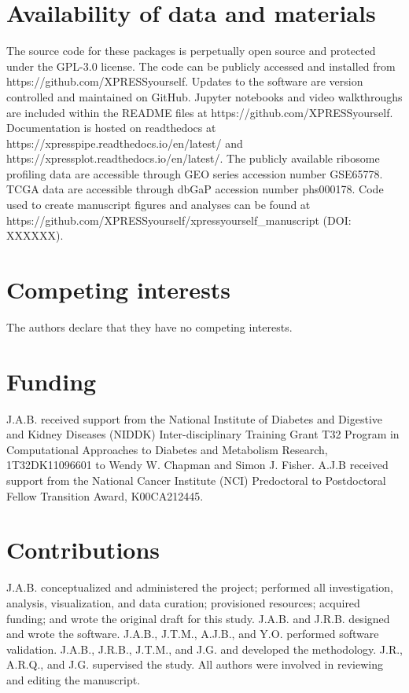 \documentclass[10pt, oneside]{article}
\begin{document}
\section*{Availability of data and materials}
The source code for these packages is perpetually open source and protected under the GPL-3.0 license. The code can be publicly accessed and installed from https://github.com/XPRESSyourself. Updates to the software are version controlled and maintained on GitHub. Jupyter notebooks and video walkthroughs are included within the README files at https://github.com/XPRESSyourself. Documentation is hosted on readthedocs \cite{readthedocs} at https://xpresspipe.readthedocs.io/en/latest/ and https://xpressplot.readthedocs.io/en/latest/. The publicly available ribosome profiling data are accessible through GEO series accession number GSE65778. TCGA data are accessible through dbGaP accession number phs000178. Code used to create manuscript figures and analyses can be found at https://github.com/XPRESSyourself/xpressyourself\_manuscript (DOI: XXXXXX).

\section*{Competing interests}
The authors declare that they have no competing interests.

\section*{Funding}
J.A.B. received support from the National Institute of Diabetes and Digestive and Kidney Diseases (NIDDK) Inter-disciplinary Training Grant T32 Program in Computational Approaches to Diabetes and Metabolism Research, 1T32DK11096601 to Wendy W. Chapman and Simon J. Fisher. A.J.B received support from the National Cancer Institute (NCI) Predoctoral to Postdoctoral Fellow Transition Award, K00CA212445.

\section*{Contributions}
J.A.B. conceptualized and administered the project; performed all investigation, analysis, visualization, and data curation; provisioned resources; acquired funding; and wrote the original draft for this study. J.A.B. and J.R.B. designed and wrote the software. J.A.B., J.T.M., A.J.B., and Y.O. performed software validation. J.A.B., J.R.B., J.T.M., and J.G. and developed the methodology. J.R., A.R.Q., and J.G. supervised the study. All authors were involved in reviewing and editing the manuscript.
\end{document}
